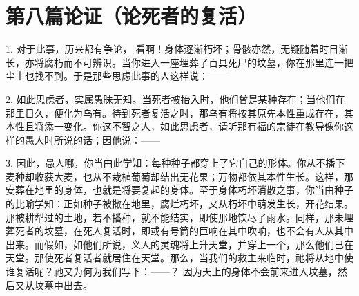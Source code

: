 

\section{第八篇论证（论死者的复活）}

1. 对于此事，历来都有争论， 看啊！身体逐渐朽坏；骨骸亦然，无疑随着时日渐长，亦将腐朽而不可辨识。当你进入一座埋葬了百具死尸的坟墓，你在那里连一把尘土也找不到。于是那些思虑此事的人这样说：——\par

2. 如此思虑者，实属愚昧无知。当死者被抬入时，他们曾是某种存在；当他们在那里日久，便化为乌有。待到死者复活之时，那乌有将按其原先本性重成存在，其本性且将添一变化。你这不智之人，如此思虑者，请听那有福的宗徒在教导像你这样的愚人时所说的话；因他说：——\par

3. 因此，愚人哪，你当由此学知：每种种子都穿上了它自己的形体。你从不播下麦种却收获大麦，也从不栽植葡萄却结出无花果；万物都依其本性生长。这样，那安葬在地里的身体，也就是将要复起的身体。至于身体朽坏消散之事，你当由种子的比喻学知：正如种子被撒在地里，腐烂朽坏，又从朽坏中萌发生长，开花结果。那被耕犁过的土地，若不播种，就不能结实，即使那地饮尽了雨水。同样，那未埋葬死者的坟墓，在死人复活时，即或有号筒的巨响在其中吹响，也不会有人从其中出来。而假如，如他们所说，义人的灵魂将上升天堂，并穿上一个，那么他们已在天堂。那使死者复活者就居住在天堂。那么，当我们的救主来临时，祂将从地中使谁复活呢？祂又为何为我们写下：——？ 因为天上的身体不会前来进入坟墓，然后又从坟墓中出去。\par

